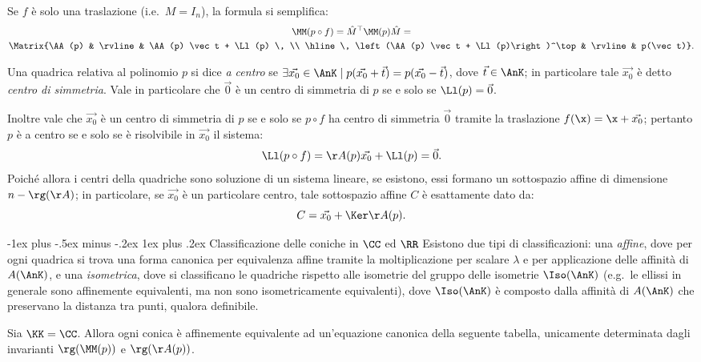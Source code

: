 \documentclass[10pt,landscape]{article}
\makeatletter
\renewcommand{\subsubsection}{\@startsection{subsubsection}{3}{0mm}%
	{-1ex plus -.5ex minus -.2ex}%
	{1ex plus .2ex}%
	{\normalfont\small\bfseries}}
\makeatother
\begin{document}
\begin{multicols}{3}
		Se $f$ è solo una traslazione (i.e.~$M = I_n$), la formula si semplifica:
		\begin{gather*}
			\MM(p \circ f) = {\hat M}^\top \MM(p) \hat M = \\
			\Matrix{\AA(p) & \rvline & \AA(p) \vec t + \Ll(p) \, \\ \hline \, 	\left(\AA(p) \vec t + \Ll(p)\right)^\top & \rvline & p(\vec t)}.
		\end{gather*}

  
        Una quadrica relativa al polinomio $p$ si dice \textit{a centro} se
        $\exists \vec{x_0} \in \AnK \mid p(\vec{x_0} + \vec t) = p(\vec{x_0} - \vec t)$,
        dove $\vec t \in \AnK$; in particolare tale $\vec{x_0}$ è detto \textit{centro di simmetria}. Vale in particolare che $\vec 0$ è un centro di simmetria di $p$ se
        e solo se $\Ll(p) = \vec 0$. \\ \vskip 0.05in
        
        Inoltre vale che $\vec{x_0}$ è un centro di simmetria di $p$ se e solo se $p \circ f$ ha centro di simmetria
        $\vec 0$ tramite
        la traslazione $f(\x) = \x + \vec{x_0}$; pertanto $p$ è a centro se e solo se è risolvibile in $\vec{x_0}$ il sistema:
        \[ \Ll(p \circ f) = \AA(p) \vec {x_0} + \Ll(p) = \vec 0.\]
        Poiché allora i centri della quadriche sono soluzione di un sistema lineare, se esistono, essi formano un sottospazio affine di dimensione $n-\rg(\AA)$; in particolare, se $\vec{x_0}$ è un particolare centro, tale sottospazio affine $C$ è
        esattamente dato da:
        \[ C = \vec{x_0} + \Ker \AA(p). \]

        \subsubsection{Classificazione delle coniche in $\CC$ ed $\RR$}
        Esistono due tipi di classificazioni: una \textit{affine}, dove per ogni quadrica si trova una forma canonica per equivalenza affine tramite la moltiplicazione per scalare $\lambda$ e per applicazione delle affinità di $A(\AnK)$, e una \textit{isometrica}, dove si classificano le quadriche rispetto alle isometrie del gruppo delle isometrie $\Iso(\AnK)$ (e.g.~le ellissi in generale sono affinemente equivalenti, ma non sono isometricamente equivalenti), dove $\Iso(\AnK)$ è composto dalla affinità di $A(\AnK)$
        che preservano la distanza tra punti, qualora definibile.

		Sia $\KK=\CC$. Allora ogni conica è affinemente equivalente ad
		un'equazione canonica della seguente tabella, unicamente
		determinata dagli invarianti $\rg(\MM(p))$ e $\rg(\AA(p))$.
		

\end{multicols}
\end{document}
